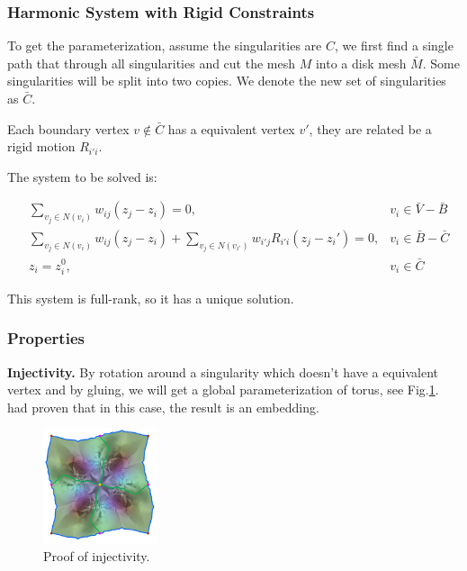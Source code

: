 \documentclass[fleqn,10pt]{wlscirep}
\begin{document}
\subsubsection{Harmonic System with Rigid Constraints}

To get the parameterization, assume the singularities are $C$, we first find a single path that through all singularities and cut the mesh $M$ into a disk mesh $\bar{M}$. Some singularities will be split into two copies. We denote the new set of singularities as $\bar{C}$.

Each boundary vertex $v\not \in \bar{C}$ has a equivalent vertex $v'$, they are related be a rigid motion $R_{i'i}$.

The system to be solved is:

\begin{equation}
\begin{split}
&\sum_{v_j \in N(v_i)}w_{ij}(z_j - z_i) = 0, &v_i \in \bar{V}-\bar{B}\\
&\sum_{v_j \in N(v_i)}w_{ij}(z_j - z_i) + \sum_{v_j\in N(v_{i'})} w_{i'j}R_{i'i}(z_j - z_i')= 0, &v_i \in \bar{B} - \bar{C}\\
&z_i = z_i^0 , &v_i \in \bar{C}
\end{split}
\end{equation}

This system is full-rank, so it has a unique solution.

\subsubsection{Properties}

\textbf{Injectivity. }
By rotation around a singularity which doesn't have a equivalent vertex and by gluing, we will get a global parameterization of torus, see Fig.\ref{torus}. \cite{Gortler:2006:DOM:1133946.1648437} had proven that in this case, the result is an embedding. 

\begin{figure}
\centering
\includegraphics[width=0.3\textwidth]{images/torus}
\caption{Proof of injectivity.}
\label{torus}
\end{figure}
\end{document}
